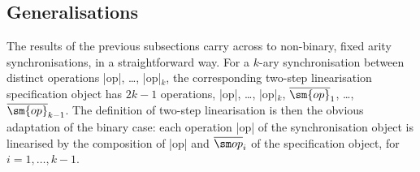 \subsection{Generalisations}
\label{ssec:relating-variations}

The results of the previous subsections carry across to non-binary, fixed
arity synchronisations, in a straightforward way.  For a $k$-ary
synchronisation between distinct operations |op|, \ldots, |op|$_k$, the
corresponding two-step linearisation specification object has $2k-1$
operations, |op|, \ldots, |op|$_k$, $\overline{\sm{op}}_1$, \ldots,
$\overline{\sm{op}}_{k-1}$.  The definition of two-step linearisation is then
the obvious adaptation of the binary case: each operation |op| of the
synchronisation object is linearised by the composition of |op| and
$\overline{\op}_i$ of the specification object, for $i = 1, \ldots, k-1$.



